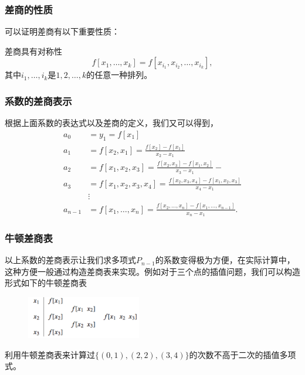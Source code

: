 \documentclass[10pt]{beamer}
\begin{document}
\begin{frame}
\frametitle{差商的性质}
可以证明差商有以下重要性质：
\begin{lemma}[差商的对称性]
差商具有对称性
\begin{equation}
f[x_1, \ldots, x_k] = f[x_{i_1}, x_{i_2}, \ldots, x_{i_k}],
\end{equation}
其中$i_1, \ldots, i_k$是$1, 2, \ldots, k$的任意一种排列。
\end{lemma}
\end{frame}

\begin{frame}
\frametitle{系数的差商表示}
根据上面系数的表达式以及差商的定义，我们又可以得到，
\begin{align}
a_0   & = y_1 = f[x_1]\nonumber \\
a_1   & = f[x_2, x_1] = \frac{f[x_2] - f[x_1]}{x_2 - x_1} \nonumber \\
a _2  & = f[x_1, x_2, x_3] = \frac{f[x_2,x_3] - f[x_1,x_2]}{x_3 - x_1}   - \nonumber \\
a_3   & = f[x_1, x_2 , x_3, x_4] = \frac{f[x_2,x_3,x_4] - f[x_1,x_2,x_3]}{x_4 - x_1}  \nonumber \\
&\vdots \nonumber\\
a_{n-1} & = f[x_1, \ldots, x_n] = \frac{f[x_2,\ldots,x_n] - f[x_1,\ldots,x_{n-1}]}{x_n - x_1}.
\end{align}
\end{frame}


\begin{frame}
\frametitle{牛顿差商表}
以上系数的差商表示让我们求多项式$P_{n-1}$的系数变得极为方便，在实际计算中，这种方便一般通过构造差商表来实现。例如对于三个点的插值问题，我们可以构造形式如下的牛顿差商表
\begin{figure}
\includegraphics[width=5cm]{figs/3-1-2_Newton-1} 
\end{figure}

\begin{example}
利用牛顿差商表来计算过$\{(0,1),(2,2),(3,4)\}$的次数不高于二次的插值多项式。
\end{example}
\end{frame}
\end{document}
